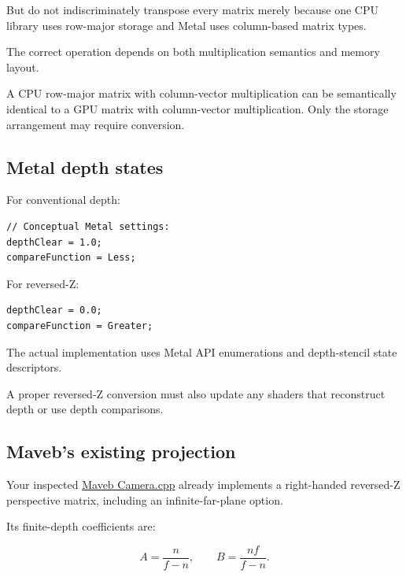 But do not indiscriminately transpose every matrix merely because one CPU library uses row-major storage and Metal uses column-based matrix types.

The correct operation depends on both multiplication semantics and memory layout.

A CPU row-major matrix with column-vector multiplication can be semantically identical to a GPU matrix with column-vector multiplication. Only the storage arrangement may require conversion.

\subsection{Metal depth states}\label{02-foundations-ii-ch033-metal-depth-states}

\hypertarget{02-foundations-ii-ch033-metal-depth-states}{}

For conventional depth:

\begin{verbatim}
// Conceptual Metal settings:
depthClear = 1.0;
compareFunction = Less;
\end{verbatim}

For reversed-Z:

\begin{verbatim}
depthClear = 0.0;
compareFunction = Greater;
\end{verbatim}

The actual implementation uses Metal API enumerations and depth-stencil state descriptors.

A proper reversed-Z conversion must also update any shaders that reconstruct depth or use depth comparisons.

\subsection{Maveb's existing projection}\label{02-foundations-ii-ch033-mavebs-existing-projection}

\hypertarget{02-foundations-ii-ch033-mavebs-existing-projection}{}

Your inspected \href{https://github.com/swayam8624/Maveb/blob/main/engine/scene/src/Camera.cpp?utm_source=chatgpt.com}{Maveb Camera.cpp} already implements a right-handed reversed-Z perspective matrix, including an infinite-far-plane option.

Its finite-depth coefficients are:

\[
 \boxed{ A=\frac n{f-n}, \qquad B=\frac{nf}{f-n} }.
\]

